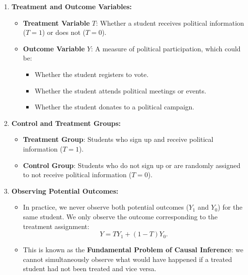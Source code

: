 \documentclass[12pt]{article}
\begin{document}
\begin{enumerate}
\begin{enumerate}[label=(\alph*)]
    \item \textbf{Treatment and Outcome Variables:}
    \begin{itemize}
        \item \textbf{Treatment Variable} \( T \): Whether a student receives political information (\( T = 1 \)) or does not (\( T = 0 \)).
        \item \textbf{Outcome Variable} \( Y \): A measure of political participation, which could be:
        \begin{itemize}
            \item Whether the student registers to vote.
            \item Whether the student attends political meetings or events.
            \item Whether the student donates to a political campaign.
        \end{itemize}
    \end{itemize}

    \item \textbf{Control and Treatment Groups:}
    \begin{itemize}
        \item \textbf{Treatment Group}: Students who sign up and receive political information (\( T = 1 \)).
        \item \textbf{Control Group}: Students who do not sign up or are randomly assigned to not receive political information (\( T = 0 \)).
    \end{itemize}

    \item \textbf{Observing Potential Outcomes:}
    \begin{itemize}
        \item In practice, we never observe both potential outcomes (\( Y_1 \) and \( Y_0 \)) for the same student. We only observe the outcome corresponding to the treatment assignment:
        \[
        Y = T Y_1 + (1 - T) Y_0.
        \]
        \item This is known as the \textbf{Fundamental Problem of Causal Inference}: we cannot simultaneously observe what would have happened if a treated student had not been treated and vice versa.
    \end{itemize}


\end{enumerate}
\end{enumerate}
\end{document}
